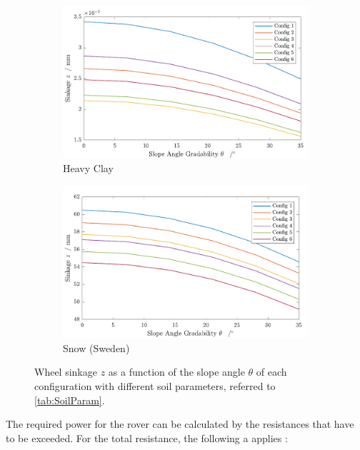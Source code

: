 \begin{figure}[htb]
     \centering
     \begin{subfigure}[b]{0.49\textwidth}
         \centering
         \includegraphics[width=\textwidth]{Media/Sinkage for each config in heavy clay.pdf}
         \caption{Heavy Clay}
     \end{subfigure}
     \hfill
     \begin{subfigure}[b]{0.49\textwidth}
         \centering
         \includegraphics[width=\textwidth]{Media/Sinkage for each config in snow (Sweden).pdf}
         \caption{Snow (Sweden)}
     \end{subfigure}
     \caption{Wheel sinkage \(z\) as a function of the slope angle \(\theta\) of each configuration with different soil parameters, referred to \autoref{tab:SoilParam}.}
     \label{fig:Sinkage}
\end{figure}

The required power for the rover can be calculated by the resistances that have to be exceeded. For the total resistance, the following a applies \cite{Parameters}:

